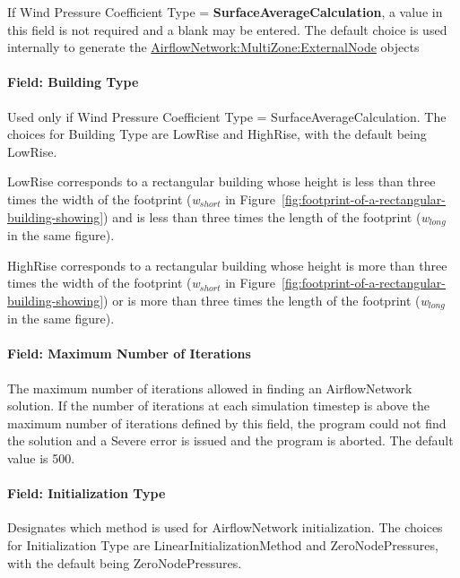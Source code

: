 If Wind Pressure Coefficient Type = \textbf{SurfaceAverageCalculation}, a value in this field is not required and a blank may be entered. The default choice is used internally to generate the \hyperref[airflownetworkmultizoneexternalnode]{AirflowNetwork:MultiZone:ExternalNode} objects

\paragraph{Field: Building Type}\label{field-building-type}

Used only if Wind Pressure Coefficient Type = SurfaceAverageCalculation. The choices for Building Type are LowRise and HighRise, with the default being LowRise.

LowRise corresponds to a rectangular building whose height is less than three times the width of the footprint (\emph{w\(_{short}\)} in Figure~\ref{fig:footprint-of-a-rectangular-building-showing}) and is less than three times the length of the footprint (\emph{w\(_{long}\)} in the same figure).

HighRise corresponds to a rectangular building whose height is more than three times the width of the footprint (\emph{w\(_{short}\)} in Figure~\ref{fig:footprint-of-a-rectangular-building-showing}) or is more than three times the length of the footprint (\emph{w\(_{long}\)} in the same figure).

\paragraph{Field: Maximum Number of Iterations}\label{field-maximum-number-of-iterations}

The maximum number of iterations allowed in finding an AirflowNetwork solution. If the number of iterations at each simulation timestep is above the maximum number of iterations defined by this field, the program could not find the solution and a Severe error is issued and the program is aborted. The default value is 500.

\paragraph{Field: Initialization Type}\label{field-initialization-type}

Designates which method is used for AirflowNetwork initialization. The choices for Initialization Type are LinearInitializationMethod and ZeroNodePressures, with the default being ZeroNodePressures.

